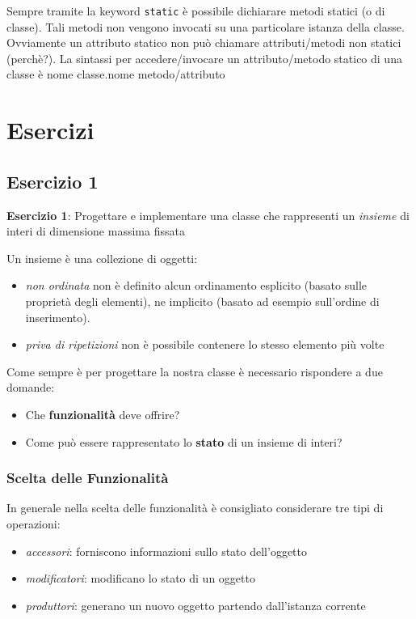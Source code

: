 \documentclass{article}
\begin{document}
Sempre tramite la keyword \texttt{static}
è possibile dichiarare metodi statici (o di classe).
Tali metodi non vengono invocati su una particolare
istanza della classe.
Ovviamente un attributo statico non può chiamare
attributi/metodi non statici (perchè?).
La sintassi per accedere/invocare un attributo/metodo statico
di una classe è
nome classe.nome metodo/attributo

\section{Esercizi}

\subsection{Esercizio 1}

\begin{framed}
\textbf{Esercizio 1}: Progettare e implementare una classe che rappresenti un \emph{insieme} di interi di dimensione massima fissata
\end{framed}

Un insieme \`e una collezione di oggetti:
\begin{itemize}
	\item \emph{non ordinata} non è definito alcun ordinamento esplicito (basato sulle proprietà degli elementi),
	ne implicito (basato ad esempio sull'ordine di inserimento).
	\item \emph{priva di ripetizioni} non è possibile contenere lo stesso elemento più volte
\end{itemize}

Come sempre \`e per progettare la nostra classe \`e necessario rispondere a due domande:
\begin{itemize}
		\item Che \textbf{funzionalità} deve offrire?
	\item Come può essere rappresentato lo \textbf{stato} di un insieme di interi?
\end{itemize}

\subsubsection{Scelta delle Funzionalit\`a}
In generale nella scelta delle funzionalit\`a \`e consigliato considerare tre tipi di operazioni:

\begin{itemize}
\item \emph{accessori}: forniscono informazioni sullo stato dell'oggetto
\item \emph{modificatori}: modificano lo stato di un oggetto
\item \emph{produttori}: generano un nuovo oggetto partendo dall'istanza corrente
\end{itemize}
\end{document}
